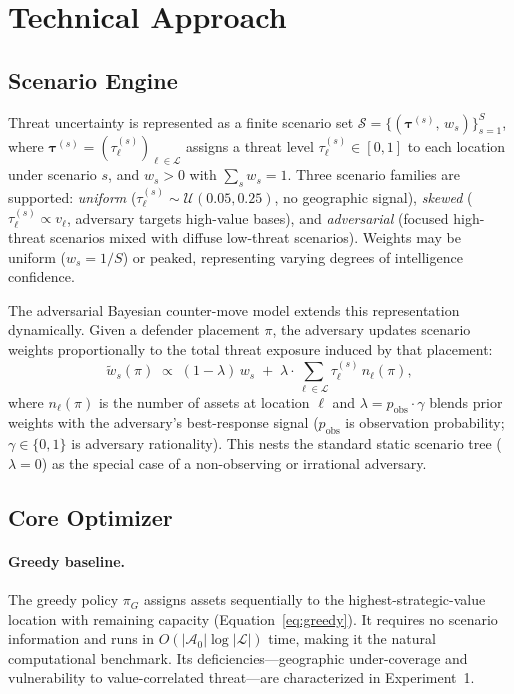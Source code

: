 \documentclass[11pt]{article}
\begin{document}
\section{Technical Approach}
\label{sec:approach}

\subsection{Scenario Engine}
\label{sec:approach:scenarios}

Threat uncertainty is represented as a finite scenario set
$\mathcal{S} = \{(\boldsymbol{\tau}^{(s)},\, w_s)\}_{s=1}^{S}$, where
$\boldsymbol{\tau}^{(s)} = (\tau_\ell^{(s)})_{\ell \in \mathcal{L}}$
assigns a threat level $\tau_\ell^{(s)} \in [0,1]$ to each location
under scenario $s$, and $w_s > 0$ with $\sum_s w_s = 1$.
Three scenario families are supported: \emph{uniform}
($\tau_\ell^{(s)} \sim \mathcal{U}(0.05, 0.25)$, no geographic signal),
\emph{skewed} ($\tau_\ell^{(s)} \propto v_\ell$, adversary targets
high-value bases), and \emph{adversarial} (focused high-threat scenarios
mixed with diffuse low-threat scenarios). Weights may be uniform
($w_s = 1/S$) or peaked, representing varying degrees of intelligence
confidence.

The adversarial Bayesian counter-move model extends this representation
dynamically. Given a defender placement $\pi$, the adversary updates
scenario weights proportionally to the total threat exposure induced
by that placement:
\begin{equation}
    \tilde{w}_s(\pi) \;\propto\;
    (1 - \lambda)\,w_s
    \;+\;
    \lambda \cdot \sum_{\ell \in \mathcal{L}}
    \tau_\ell^{(s)}\, n_\ell(\pi),
    \label{eq:adv_weight}
\end{equation}
where $n_\ell(\pi)$ is the number of assets at location $\ell$ and
$\lambda = p_{\mathrm{obs}} \cdot \gamma$ blends prior weights with the
adversary's best-response signal ($p_{\mathrm{obs}}$ is observation
probability; $\gamma \in \{0, 1\}$ is adversary rationality).
This nests the standard static scenario tree ($\lambda = 0$) as the
special case of a non-observing or irrational adversary.

\subsection{Core Optimizer}
\label{sec:approach:optimizer}

\paragraph{Greedy baseline.}
The greedy policy $\pi_G$ assigns assets sequentially to the
highest-strategic-value location with remaining capacity
(Equation~\eqref{eq:greedy}). It requires no scenario information and
runs in $O(|\mathcal{A}_0| \log |\mathcal{L}|)$ time, making it the
natural computational benchmark. Its deficiencies---geographic
under-coverage and vulnerability to value-correlated threat---are
characterized in Experiment~1.
\end{document}
